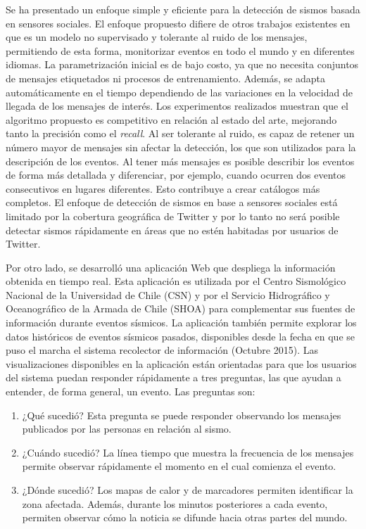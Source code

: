 \begin{conclusion}
\label{cap:conclusion}	

Se ha presentado un enfoque simple y eficiente para la detección de sismos basada en sensores sociales. El enfoque propuesto difiere de otros trabajos existentes en que es un modelo no supervisado y tolerante al ruido de los mensajes, permitiendo de esta forma, monitorizar eventos en todo el mundo y en diferentes idiomas. La parametrización inicial es de bajo costo, ya que no necesita conjuntos de mensajes etiquetados ni procesos de entrenamiento. Además, se adapta automáticamente en el tiempo dependiendo de las variaciones en la velocidad de llegada de los mensajes de interés. Los experimentos realizados muestran que el algoritmo propuesto es competitivo en relación al estado del arte, mejorando tanto la precisión como el {\em recall}. Al ser tolerante al ruido, es capaz de retener un número mayor de mensajes sin afectar la detección, los que son utilizados para la descripción de los eventos. Al tener más mensajes es posible describir los eventos de forma más detallada y diferenciar, por ejemplo, cuando ocurren dos eventos consecutivos en lugares diferentes. Esto contribuye a crear catálogos más completos. El enfoque de detección de sismos en base a sensores sociales está limitado por la cobertura geográfica de Twitter y por lo tanto no será posible detectar sismos rápidamente en áreas que no estén habitadas por usuarios de Twitter. 

Por otro lado, se desarrolló una aplicación Web que despliega la información obtenida en tiempo real. Esta aplicación es utilizada por el Centro Sismológico Nacional de la Universidad de Chile (CSN) y por el Servicio Hidrográfico y Oceanográfico de la Armada de Chile (SHOA) para complementar sus fuentes de información durante eventos sísmicos. 
La aplicación también permite explorar los datos históricos de eventos sísmicos pasados, disponibles desde la fecha en que se puso el marcha el sistema recolector de información (Octubre 2015). Las visualizaciones disponibles en la aplicación están orientadas para que los usuarios del sistema puedan responder rápidamente a tres preguntas, las que ayudan a entender, de forma general, un evento. Las preguntas son: 
\begin{enumerate}
\item ¿Qué sucedió? Esta pregunta se puede responder observando los mensajes publicados por las personas en relación al sismo.
\item ¿Cuándo sucedió? La línea tiempo que muestra la frecuencia de los mensajes permite observar rápidamente el momento en el cual comienza el evento. 
\item ¿Dónde sucedió? Los mapas de calor y de marcadores permiten identificar la zona afectada. Además, durante los minutos posteriores a cada evento, permiten observar cómo la noticia se difunde hacia otras partes del mundo.
\end{enumerate} 


\end{conclusion}
